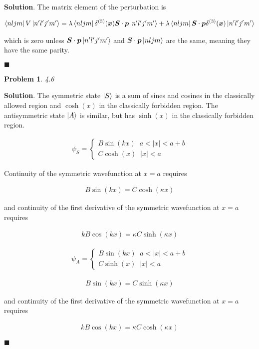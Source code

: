 \documentclass[12pt]{article}
\newtheorem{p}{Problem}
\theoremstyle{definition}
\newenvironment{s}{%
        \begin{trivlist} \item \textbf{Solution}. }{%
            \hspace*{\fill} $\blacksquare$\end{trivlist}}%
\begin{document}
{\begin{s}
The matrix element of the perturbation is 

\begin{align*}
\bra{nljm}V\ket{n'l'j'm'} = \lambda \bra{nljm}\delta^{(3)}(\bm{x})\bm{S}\cdot \bm{p}\ket{n'l'j'm'} + \lambda \bra{nljm}\bm{S}\cdot \bm{p}\delta^{(3)}(\bm{x})\ket{n'l'j'm'}
\end{align*}

which is zero unless $\bm{S}\cdot \bm{p}\ket{n'l'j'm'}$ and $\bm{S}\cdot \bm{p}\ket{nljm}$ are the same, meaning they have the same parity. 

\end{s}

\begin{p}
4.6
\end{p}

\begin{s}
The symmetric state $\ket{S}$ is a sum of sines and cosines in the classically allowed region and $\cosh (x)$ in the classically forbidden region. The antisymmetric state $\ket{A}$ is similar, but has $\sinh (x)$ in the classically forbidden region. 

\begin{align*}
\psi_S = \begin{cases}
  B\sin(kx)  \;\;a < |x| < a+b\\
  C\cosh(x) \;\; |x| < a
\end{cases}
\end{align*}

Continuity of the symmetric wavefunction at $x = a$ requires

\begin{align*}
B\sin(kx) = C\cosh(\kappa x)
\end{align*}

and continuity of the first derivative of the symmetric wavefunction at $x = a$ requires

\begin{align*}
kB\cos(kx) = \kappa C\sinh(\kappa x)
\end{align*}

\begin{align*}
\psi_A = \begin{cases}
  B\sin(kx)  \;\;a < |x| < a+b\\
  C\sinh(x) \;\; |x| < a
\end{cases}
\end{align*}

\begin{align*}
B\sin(kx) = C\sinh(\kappa x)
\end{align*}

and continuity of the first derivative of the symmetric wavefunction at $x = a$ requires

\begin{align*}
kB\cos(kx) = \kappa C\cosh(\kappa x)
\end{align*}


\end{s}
\end{document}
